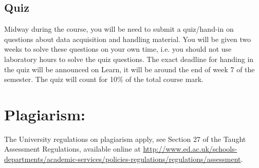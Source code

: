 \subsection{Quiz}
Midway during the course, you will be need to submit a quiz/hand-in on  questions about data acquisition and handling material. You will be given two weeks to solve these questions on your own time, i.e. you should not use laboratory hours to solve the quiz questions. The exact deadline for handing in the quiz will be announced on Learn, it will be around the end of week 7 of the semester. 
The quiz will count for 10\% of the total course mark. 

\section{Plagiarism:}
The University regulations on plagiarism apply, see Section 27 of the Taught Assessment Regulations, available online at \url{http://www.ed.ac.uk/schools-departments/academic-services/policies-regulations/regulations/assessment}.


